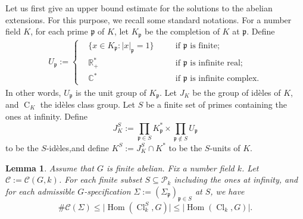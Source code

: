 \documentclass[12pt,a4paper]{amsart}
\numberwithin{equation}{section}%
\theoremstyle{plain}%
\newtheorem{lemma}[theorem]{Lemma}%
\theoremstyle{definition}%
\theoremstyle{remark}%
\begin{document}
	Let us first give an upper bound estimate for the solutions to the abelian extensions.
	For this purpose, we recall some standard notations.
	For a number field $K$, for each prime $\mathfrak{p}$ of $K$, let $K_{\mathfrak{p}}$ be the completion of $K$ at $\mathfrak{p}$.
	Define
	\begin{equation*}
		\begin{aligned}
			U_{\mathfrak{p}}:=\left\{
			\begin{aligned}
				&\{x\in K_{\mathfrak{p}}:\lvert x\rvert_{\mathfrak{p}}=1\}&\quad &\text{if }\mathfrak{p}\text{ is finite};
				\\
				&\mathbb{R}_+^*&\quad&\text{if }\mathfrak{p}\text{ is infinite real};
				\\
				&\mathbb{C}^*&\quad &\text{if }\mathfrak{p}\text{ is infinite complex}.
			\end{aligned}\right.
		\end{aligned}
	\end{equation*}
	In other words, $U_{\mathfrak{p}}$ is the unit group of $K_{\mathfrak{p}}$.
	Let $J_K$ be the group of id{\`e}les of $K$, and $\operatorname{C}_K$ the id{\`e}les class group.
	Let $S$ be a finite set of primes containing the ones at infinity.
	Define
	\begin{equation*}
		J_K^{S}:=\prod_{\mathfrak{p}\in S}K_{\mathfrak{p}}^*\times\prod_{\mathfrak{p}\notin S}U_{\mathfrak{p}}
	\end{equation*} 
	to be the $S$-id{\`e}les,and define $K^S:=J_K^S\cap K^*$ to be the $S$-units of $K$.
	\begin{lemma}\label{lemma: restricted ramification for abelian extensions}
		Assume that $G$ is finite abelian.
		Fix a number field $k$.
		Let $\mathcal{C}:=\mathcal{C}(G,k)$.		
		For each finite subset $S\subseteq\mathcal{P}_k$ including the ones at infinity, and for each admissible $G$-specification $\Sigma:=(\Sigma_{\mathfrak{p}})_{\mathfrak{p}\in S}$ at $S$, we have
		\begin{equation*}
			\#\mathcal{C}(\Sigma)\leq\lvert\operatorname{Hom}(\operatorname{Cl}^{S}_{k},G)\rvert\leq\lvert\operatorname{Hom}(\operatorname{Cl}_{k},G)\rvert.
		\end{equation*}
	\end{lemma}
\end{document}
